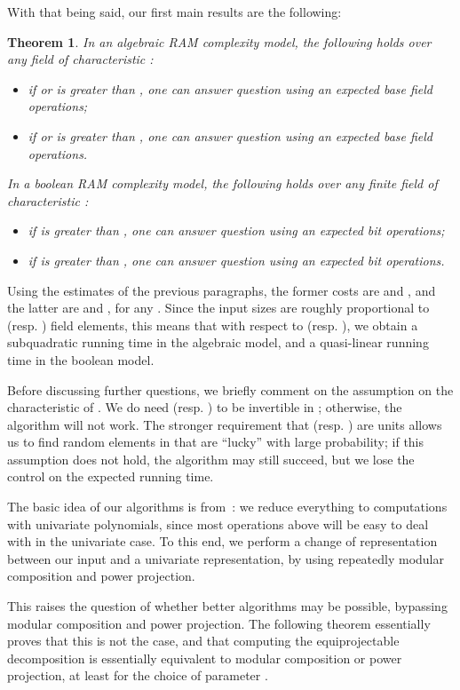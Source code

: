 \documentclass[12pt]{article}
\newtheorem{Theo}{Theorem}
\begin{document}
With that being said, our first main results are the following:
\begin{Theo}
  \label{theo:CtoE}
  In an algebraic RAM complexity model, the following holds over any
  field  of characteristic :
  \begin{itemize}
  \item if  or  is greater than , one can answer
    question  using an expected
     base field
    operations;
  \item if  or  is greater than , one can answer
    question  using an expected
     base field operations.
  \end{itemize}
  In a boolean RAM complexity model, the following holds over any
  finite field  of characteristic :
  \begin{itemize}
  \item if  is greater than , one can answer question
     using an expected  bit operations;
  \item if  is greater than , one can answer question
     using an expected  bit operations.
  \end{itemize}
\end{Theo}
Using the estimates of the previous paragraphs, the former costs are
 and , and the latter are
 and , for any .  Since
the input sizes are roughly proportional to 
(resp. ) field elements, this means that with respect to
 (resp. ), we obtain a subquadratic running time
in the algebraic model, and a quasi-linear running time in the boolean
model.

Before discussing further questions, we briefly comment on the
assumption on the characteristic of . We do need 
(resp. ) to be invertible in ; otherwise, the
algorithm will not work. The stronger requirement that
 (resp. ) are units allows us
to find random elements in  that are ``lucky'' with large
probability; if this assumption does not hold, the algorithm may still
succeed, but we lose the control on the expected running time.


The basic idea of our algorithms is from~\cite{PoSc10}: we reduce
everything to computations with univariate polynomials, since most
operations above will be easy to deal with in the univariate case. To
this end, we perform a change of representation between our input and
a univariate representation, by using repeatedly modular composition
and power projection.

This raises the question of whether better algorithms may be possible,
bypassing modular composition and power projection.  The following
theorem essentially proves that this is not the case, and that
computing the equiprojectable decomposition is essentially equivalent
to modular composition or power projection, at least for the choice of
parameter .
\end{document}
